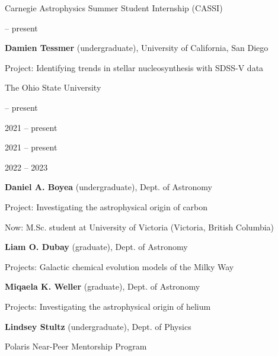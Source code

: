 \documentclass[cv.tex]{subfiles}
\begin{document}
{\color{themecolor} \large Carnegie Astrophysics Summer Student Internship
(CASSI)}
\par\noindent
\parbox{0.18\textwidth}{%
	 -- present \par
	\null \par
}
\hspace{1mm}
\parbox{0.8\textwidth}{%
	\vspace{1mm}
	\textbf{Damien Tessmer} (undergraduate), University of California,
	San Diego \par
	Project: Identifying trends in stellar nucleosynthesis with SDSS-V data \par
}

\vspace{4mm}
\noindent
{\color{themecolor} \large The Ohio State University}
\par\noindent
\parbox{0.18\textwidth}{%
	 -- present \par
	\null \par
	\null \par
	2021 -- present \par
	\null \par
	2021 -- present \par
	\null \par
	2022 -- 2023 \par
	\null
}
\hspace{1mm}
\parbox{0.8\textwidth}{%
	\vspace{1mm}
	\textbf{Daniel A. Boyea} (undergraduate), Dept. of Astronomy \par
	Project: Investigating the astrophysical origin of carbon \par
	Now: M.Sc. student at University of Victoria (Victoria, British Columbia) \par
	\textbf{Liam O. Dubay} (graduate), Dept. of Astronomy \par
	Projects: Galactic chemical evolution models of the Milky Way \par
	\textbf{Miqaela K. Weller} (graduate), Dept. of Astronomy \par
	Projects: Investigating the astrophysical origin of helium \par
	\textbf{Lindsey Stultz} (undergraduate), Dept. of Physics \par
	Polaris Near-Peer Mentorship Program
}
\end{document}
